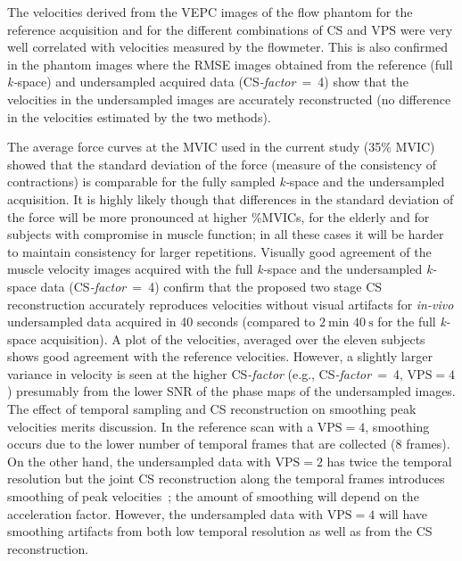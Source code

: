 The velocities derived from the VEPC images of the flow phantom for the reference acquisition and for the different combinations of CS and VPS were very well correlated with velocities measured by the flowmeter. 
This is also confirmed in the phantom images where the RMSE images obtained from the reference (full \mbox{\textit{k-}space}) and undersampled acquired data (\mbox{CS\textit{-factor} = 4}) show that the velocities in the undersampled images are accurately reconstructed (no difference in the velocities estimated by the two methods). 

The average force curves at the MVIC used in the current study (35\% MVIC) showed that the standard deviation of the force (measure of the consistency of contractions) is comparable for the fully sampled \mbox{\textit{k-}space} and the undersampled acquisition. 
It is highly likely though that differences in the standard deviation of the force will be more pronounced at higher \%MVICs, for the elderly and for subjects with compromise in muscle function; in all these cases it will be harder to maintain consistency for larger repetitions. 
Visually good agreement of the muscle velocity images acquired with the full \mbox{\textit{k-}space} and the undersampled \mbox{\textit{k-}space} data (\mbox{CS\textit{-factor} = 4}) confirm that the proposed two stage CS reconstruction accurately reproduces velocities without visual artifacts for \textit{in-vivo} undersampled data acquired in 40 seconds (compared to $\SI{2}{\minute}$ $\SI{40}{\second}$ for the full \mbox{\textit{k-}space} acquisition). 
A plot of the velocities, averaged over the eleven subjects shows good agreement with the reference velocities. 
However, a slightly larger variance in velocity is seen at the higher \mbox{CS\textit{-factor}} (e.g., \mbox{CS\textit{-factor} = 4}, $\mathrm{VPS} = 4$) presumably from the lower SNR of the phase maps of the undersampled images. 
The effect of temporal sampling and CS reconstruction on smoothing peak velocities merits discussion. 
In the reference scan with a $\mathrm{VPS} = 4$, smoothing occurs due to the lower number of temporal frames that are collected (8 frames). 
On the other hand, the undersampled data with $\mathrm{VPS} = 2$ has twice the temporal resolution but the joint CS reconstruction along the temporal frames introduces smoothing of peak velocities~\cite{RNCS10}; the amount of smoothing will depend on the acceleration factor. 
However, the undersampled data with $\mathrm{VPS} = 4$ will have smoothing artifacts from both low temporal resolution as well as from the CS reconstruction. 

